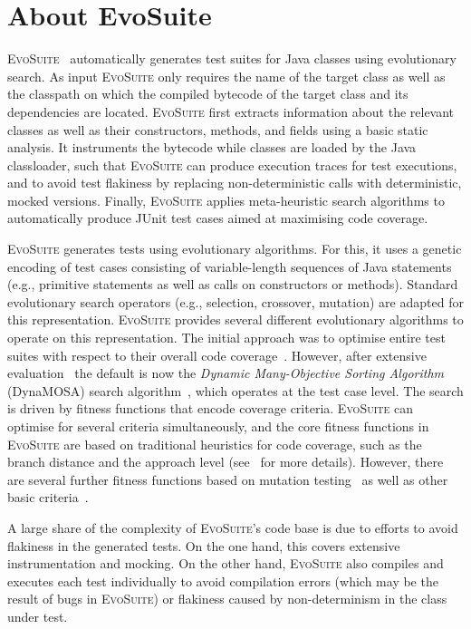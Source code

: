 \documentclass[10pt,conference]{IEEEtran}
\newcommand{\EVOSUITE}{\textsc{EvoSuite}\xspace}
\begin{document}
\section{About EvoSuite}


\EVOSUITE~\cite{FrA11c} automatically generates test suites for Java classes
using evolutionary search. As input \EVOSUITE only requires the name of the
target class as well as the classpath on which the compiled bytecode of the
target class and its dependencies are located. \EVOSUITE first extracts
information about the relevant classes as well as their constructors, methods,
and fields using a basic static analysis. It instruments the bytecode while
classes are loaded by the Java classloader, such that \EVOSUITE can produce
execution traces for test executions, and to avoid test flakiness by replacing
non-deterministic calls with deterministic, mocked versions. Finally, \EVOSUITE
applies meta-heuristic search algorithms to automatically produce JUnit test
cases aimed at maximising code coverage.


\EVOSUITE generates tests using evolutionary algorithms.
%
For this, it uses a genetic encoding of test cases consisting of variable-length sequences of Java statements (e.g., primitive statements as well as calls on constructors or methods). Standard evolutionary search operators (e.g., selection, crossover, mutation) are adapted for this representation.
%
\EVOSUITE provides several different evolutionary algorithms to operate on this
representation. The initial approach was to optimise entire test suites with
respect to their overall code coverage~\cite{GoA_TSE12}. However, after
extensive evaluation~\cite{ea_evaluation} the default is now the
\emph{Dynamic Many-Objective Sorting Algorithm} (DynaMOSA) search
algorithm~\cite{dynamosa}, which operates at the test case level.
%
The search is driven by fitness functions that encode coverage criteria. \EVOSUITE can optimise for several criteria simultaneously, and the core fitness functions in \EVOSUITE are based on traditional heuristics for code coverage, such as the branch distance and the approach level (see~\cite{GoA_TSE12} for more details). However, there are several further fitness functions based on mutation testing~\cite{emse14_mutation} as well as other basic criteria~\cite{rojas2015combining}.


A large share of the complexity of \EVOSUITE's code base is due to efforts to
avoid flakiness in the generated tests. On the one hand, this covers extensive
instrumentation and mocking. On the other hand, \EVOSUITE also compiles and
executes each test individually to avoid compilation errors (which may be the
result of bugs in \EVOSUITE) or flakiness caused by non-determinism in the
class under test.
\end{document}
